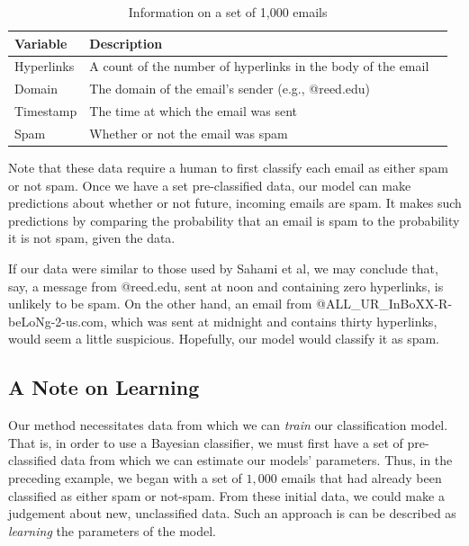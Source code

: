 \documentclass[12pt,twoside]{reedthesis}
\begin{document}
	\begin{table}[htdp] %
\caption[Example Data for Classifications]{Information on a set of 1,000 emails} 
\begin{center}
\begin{tabular}{l | l l} 
 \toprule
  \textbf{Variable} & \textbf{Description} \\ %
  \midrule %
  Hyperlinks  & A count of the number of hyperlinks in the body of the email \\ %
  Domain & The domain of the email's sender (e.g., @reed.edu) \\
  Timestamp & The time at which the email was sent \\
  Spam & Whether or not the email was spam \\
\bottomrule %
\end{tabular}
\end{center}
\label{bvf} %
\end{table}

Note that these data require a human to first classify each email as either spam or not spam. Once we have a set pre-classified data, our model can make predictions about whether or not future, incoming emails are spam. It makes such predictions by comparing the probability that an email is spam to the probability it is not spam, given the data. 

If our data were similar to those used by Sahami et al, we may conclude that, say, a message from @reed.edu, sent at noon and containing zero hyperlinks, is unlikely to be spam. On the other hand, an email from @ALL\_UR\_InBoXX-R-beLoNg-2-us.com, which was sent at midnight and contains thirty hyperlinks, would seem a little suspicious. Hopefully, our model would classify it as spam.
	
	\subsection*{A Note on Learning}
	Our method necessitates data from which we can {\em train} our classification model. That is, in order to use a Bayesian classifier, we must first have a set of pre-classified data from which we can estimate our models' parameters. Thus, in the preceding example, we began with a set of $1,000$ emails that had already been classified as either spam or not-spam. From these initial data, we could make a judgement about new, unclassified data. Such an approach is can be described as {\em learning} the parameters of the model.
	
\end{document}
